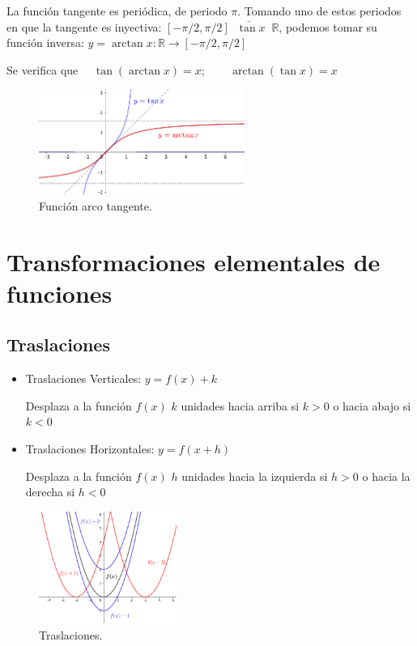 		La función tangente es periódica, de periodo $\pi$. Tomando uno de estos periodos en que la tangente es inyectiva: $[-\pi/2, \pi/2] \; \;  \underrightarrow { \tan x } \; \; \mathbb R $, podemos tomar su función inversa: $y=\arctan x: \mathbb R \to [-\pi/2, \pi/2]$
		
		Se verifica que $\quad \tan (\arctan x)=x; \qquad \arctan (\tan x)=x$
		
		
		\begin{figure}[H]
			\centering
			\includegraphics[width=0.6\textwidth]{imagenes/imagenes02/T02IM07.png}
			\caption{Función arco tangente.}
		\end{figure}
		
		

		
		\section{Transformaciones elementales de funciones}
		\subsection{Traslaciones}
		\begin{itemize}
			\item Traslaciones Verticales: $y=f(x)+k$
			
			Desplaza a la función $f(x)$ $k$ unidades hacia arriba si $k>0$ o hacia abajo si $k<0$
			
			\item Traslaciones Horizontales: $y=f(x+h)$
			
			Desplaza a la función $f(x)$ $h$ unidades hacia la izquierda si $h>0$ o hacia la derecha si $h<0$
		\end{itemize}
		
		\begin{figure}[H]
			\centering
			\includegraphics[width=0.4\textwidth]{imagenes/imagenes02/T02IM08.png}
			\caption{Traslaciones.}
		\end{figure}
		
